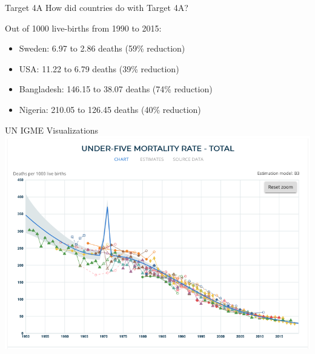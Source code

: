 \documentclass[10pt,t]{beamer}
\begin{document}
\begin{frame}{Target 4A}
How did countries do with Target 4A?

\vspace{0.3cm}

Out of 1000 live-births from 1990 to 2015:

\vspace{0.3cm}

\begin{itemize}
	\item Sweden: 6.97 to 2.86 deaths (59\% reduction)
	\item USA: 11.22 to 6.79 deaths (39\% reduction)
	\item Bangladesh: 146.15 to 38.07 deaths (74\% reduction)
	\item Nigeria: 210.05 to 126.45 deaths (40\% reduction)
\end{itemize}



\end{frame}

\begin{frame}{UN IGME Visualizations}
\centering \includegraphics[scale=0.3]{bangladesh_igme.png}
\end{frame}
\end{document}
